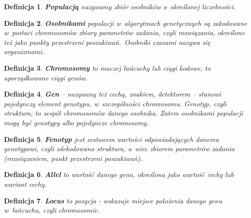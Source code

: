 \documentclass[twoside,12pt]{report}
\newtheorem{definition}{Definicja} %
\begin{document}
\begin{definition}
\textbf{Populacją} nazywamy zbiór osobników o~określonej liczebności.
\end{definition}

\vspace*{10px}

\begin{definition}
\textbf{Osobnikami} populacji w~algorytmach genetycznych są zakodowane w~postaci chromosomów zbiory parametrów zadania, czyli rozwiązania, określone też jako punkty
przestrzeni poszukiwań.~Osobniki czasami nazywa się organizmami.
\end{definition}

\vspace*{10px}

\begin{definition}
\textbf{Chromosomy} to inaczej łańcuchy lub ciągi kodowe, to uporządkowane ciągi genów.
\end{definition}

\vspace*{10px}

\begin{definition}
\textbf{Gen} – nazywany też cechą, znakiem, detektorem – stanowi pojedynczy element
genotypu, w~szczególności chromosomu. Genotyp, czyli struktura, to zespół chromosomów
danego osobnika. Zatem osobnikami populacji mogą być genotypy albo
pojedyncze chromosomy.
\end{definition}

\vspace*{10px}

\begin{definition}
\textbf{Fenotyp} jest zestawem wartości odpowiadających danemu genotypowi, czyli zdekodowana
struktura, a~wiec zbiorem parametrów zadania (rozwiązaniem, punkt przestrzeni
poszukiwań).
\end{definition}

\vspace*{10px}

\begin{definition}
\textbf{Allel} to wartość danego genu, określona jako wartość cechy lub wariant cechy.
\end{definition}

\vspace*{10px}

\begin{definition}
\textbf{Locus} to pozycja - wskazuje miejsce położenia danego genu w~łańcuchu, czyli chromosomie.
\end{definition}
\end{document}
